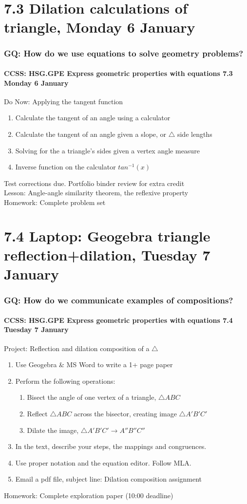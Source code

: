 \documentclass{beamer}
\begin{document}
\section{7.3 Dilation calculations of triangle, Monday 6 January}
\frame
{
  \frametitle{GQ: How do we use equations to solve geometry problems?}
  \framesubtitle{CCSS: HSG.GPE Express geometric properties with equations \hfill \alert{7.3 Monday 6 January}}

  \begin{block}{Do Now: Applying the tangent function}
  \begin{enumerate}
    \item Calculate the tangent of an angle using a calculator
    \item Calculate the tangent of an angle given a slope, or $\triangle$ side lengths
    \item Solving for the a triangle's sides given a vertex angle measure
    \item Inverse function on the calculator $tan^{-1}(x)$
  \end{enumerate}
  \end{block}
  Test corrections due. Portfolio binder review for extra credit \\
  Lesson: Angle-angle similarity theorem, the reflexive property \\
  Homework: Complete problem set 
}

\section{7.4 Laptop: Geogebra triangle reflection+dilation, Tuesday 7 January}
\frame
{
  \frametitle{GQ: How do we communicate examples of compositions?}
  \framesubtitle{CCSS: HSG.GPE Express geometric properties with equations \hfill \alert{7.4 Tuesday 7 January}}

  \begin{block}{Project: Reflection and dilation composition of a $\triangle$}
  \begin{enumerate}
    \item Use Geogebra \& MS Word to write a 1+ page paper
    \item Perform the following operations:
    \begin{enumerate}
      \item Bisect the angle of one vertex of a triangle, $\triangle ABC$
      \item Reflect $\triangle ABC$ across the bisector, creating image $\triangle A'B'C'$
      \item Dilate the image, $\triangle A'B'C' \rightarrow A''B''C''$
    \end{enumerate}
    \item In the text, describe your steps, the mappings and congruences. 
    \item Use proper notation and the equation editor. Follow MLA.
    \item Email a pdf file, subject line: Dilation composition assignment
  \end{enumerate}
  \end{block}
  Homework: Complete exploration paper (10:00 deadline)
}
\end{document}
